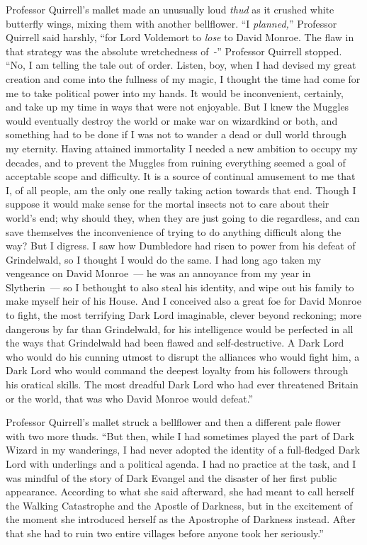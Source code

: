 Professor Quirrell's mallet made an unusually loud \emph{thud} as it crushed white butterfly wings, mixing them with another bellflower. ``I \emph{planned,}'' Professor Quirrell said harshly, ``for Lord Voldemort to \emph{lose} to David Monroe. The flaw in that strategy was the absolute wretchedness of~-'' Professor Quirrell stopped. ``No, I am telling the tale out of order. Listen, boy, when I had devised my great creation and come into the fullness of my magic, I thought the time had come for me to take political power into my hands. It would be inconvenient, certainly, and take up my time in ways that were not enjoyable. But I knew the Muggles would eventually destroy the world or make war on wizardkind or both, and something had to be done if I was not to wander a dead or dull world through my eternity. Having attained immortality I needed a new ambition to occupy my decades, and to prevent the Muggles from ruining everything seemed a goal of acceptable scope and difficulty. It is a source of continual amusement to me that I, of all people, am the only one really taking action towards that end. Though I suppose it would make sense for the mortal insects not to care about their world's end; why should they, when they are just going to die regardless, and can save themselves the inconvenience of trying to do anything difficult along the way? But I digress. I saw how Dumbledore had risen to power from his defeat of Grindelwald, so I thought I would do the same. I had long ago taken my vengeance on David Monroe~--- he was an annoyance from my year in Slytherin~--- so I bethought to also steal his identity, and wipe out his family to make myself heir of his House. And I conceived also a great foe for David Monroe to fight, the most terrifying Dark Lord imaginable, clever beyond reckoning; more dangerous by far than Grindelwald, for his intelligence would be perfected in all the ways that Grindelwald had been flawed and self-destructive. A Dark Lord who would do his cunning utmost to disrupt the alliances who would fight him, a Dark Lord who would command the deepest loyalty from his followers through his oratical skills. The most dreadful Dark Lord who had ever threatened Britain or the world, that was who David Monroe would defeat.''

Professor Quirrell's mallet struck a bellflower and then a different pale flower with two more thuds. ``But then, while I had sometimes played the part of Dark Wizard in my wanderings, I had never adopted the identity of a full-fledged Dark Lord with underlings and a political agenda. I had no practice at the task, and I was mindful of the story of Dark Evangel and the disaster of her first public appearance. According to what she said afterward, she had meant to call herself the Walking Catastrophe and the Apostle of Darkness, but in the excitement of the moment she introduced herself as the Apostrophe of Darkness instead. After that she had to ruin two entire villages before anyone took her seriously.''

